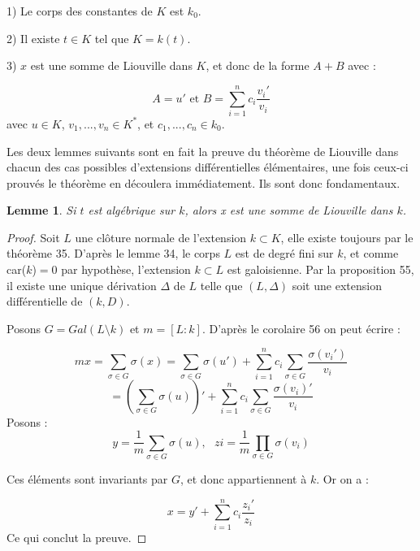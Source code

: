 \documentclass[12pt,a4paper]{report}
\newtheorem{lem}[thm]{\bf Lemme}
\begin{document}
1) Le corps des constantes de $K$ est $k_{0}$.

2) Il existe $t \in K$ tel que $K=k(t)$.

3) $x$ est une somme de Liouville dans $K$, et donc de la forme $A+B$ avec : 

$$A=u' \text{ et } B=\sum_{i=1}^{n}c_{i} \dfrac{v_{i}'}{v_{i}}$$
avec $u \in K$, $v_{1},...,v_{n} \in K^{*}$, et $c_{1},...,c_{n} \in k_{0}$. 

Les deux lemmes suivants sont en fait la preuve du théorème de Liouville dans chacun des cas possibles d'extensions différentielles élémentaires, une fois ceux-ci prouvés le théorème en découlera immédiatement. Ils sont donc fondamentaux. 

\begin{lem}\rm
Si $t$ est algébrique sur $k$, alors x est une somme de Liouville dans $k$. 
\end{lem}

\begin{proof}
Soit $L$ une clôture normale de l'extension $k \subset K$, elle existe toujours par le théorème 35. D'après le lemme 34, le corps $L$ est de degré fini sur $k$, et comme car($k$)$=0$ par hypothèse, l'extension $k \subset L$ est galoisienne. Par la proposition 55, il existe une unique dérivation $\Delta$ de $L$ telle que $(L,\Delta)$ soit une extension différentielle de $(k,D)$. 

Posons $G=Gal(L\setminus k )$ et $m=[L:k]$. D'après le corolaire 56 on peut écrire : 

$$mx=\sum_{\sigma \in G}\sigma(x)=\sum_{\sigma \in G} \sigma(u') +\sum_{i=1}^{n} c_{i}\sum_{\sigma \in G} \dfrac{\sigma(v_{i}')}{v_{i}}$$
$$=\left(\sum_{\sigma \in G} \sigma(u)\right)' +\sum_{i=1}^{n} c_{i}\sum_{\sigma \in G} \dfrac{\sigma(v_{i})'}{v_{i}}$$
Posons : 
$$y=\dfrac{1}{m}\sum_{\sigma \in G}\sigma(u), \text{   }z{i}=\dfrac{1}{m} \prod_{\sigma \in G} \sigma(v_{i})$$

Ces éléments sont invariants par $G$, et donc appartiennent à $k$. Or on a : 

$$x=y'+\sum_{i=1}^{n}c_{i}\dfrac{z_{i}'}{z_{i}}$$
Ce qui conclut la preuve. 
\end{proof}
\end{document}

